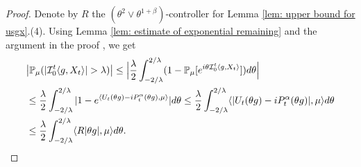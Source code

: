 \documentclass[12pt,a4paper]{amsart}
\theoremstyle{plain}
\theoremstyle{definition}
\numberwithin{equation}{section}
\begin{document}
\begin{proof}
    Denote by $R$ the $(\theta^2\vee\theta^{1+\beta})$-controller for Lemma \ref{lem: upper bound for usgx}.(4).
    Using Lemma \ref{lem: estimate of exponential remaining} and the argument in the proof \cite[Theorem 3.3.6]{Durrett2010Probability}, we get
\begin{equation}\begin{split}
    &\big|\mathbb P_\mu (|\mathcal{I}_0^t\langle g,X_t\rangle| > \lambda)\big|
    \leq \Big|\frac{\lambda}{2}\int_{-2/\lambda}^{2/\lambda}(1 - \mathbb P_\mu[e^{i\theta \mathcal{I}_0^t\langle g,X_t\rangle}])d\theta\Big|
    \\&\leq \frac{\lambda}{2}\int_{-2/\lambda}^{2/\lambda}|1-e^{\langle U_t(\theta g)-iP^\alpha_t (\theta g),\mu \rangle}|d\theta
    \leq \frac{\lambda}{2}\int_{-2/\lambda}^{2/\lambda}\langle |U_t(\theta g) - iP^\alpha_t(\theta g)|,\mu\rangle d\theta
    \\&\leq \frac{\lambda}{2}\int_{-2/\lambda}^{2/\lambda}\langle R|\theta g|,\mu\rangle d\theta.
      \qedhere
\end{split}\end{equation}
\end{proof}
\end{document}
